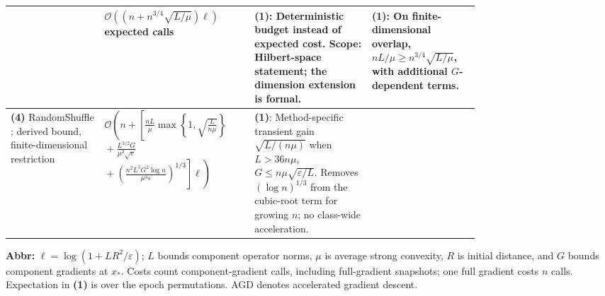 \begin{table}[tp]
\begin{threeparttable}
\begin{tabularx}{\linewidth}{@{}>{\raggedright\arraybackslash}p{0.20\linewidth}>{\raggedright\arraybackslash}p{0.32\linewidth}>{\raggedright\arraybackslash}p{0.25\linewidth}>{\raggedright\arraybackslash}X@{}}
& $\mathcal{O}((n+n^{3/4}\sqrt{L/\mu})\ell)$ expected calls
& \textbf{(1)}: Deterministic budget instead of expected cost. Scope: Hilbert-space statement; the dimension extension is formal.
& \textbf{(1)}: On finite-dimensional overlap, $nL/\mu\ge n^{3/4}\sqrt{L/\mu}$, with additional $G$-dependent terms. \\
\midrule
\textbf{(4)} RandomShuffle \citep[App.~B, Lemmas~6--8, v2]{qfsAhnYunSra2020v2}; derived bound, finite-dimensional restriction
& $\displaystyle\mathcal{O}\!\left(n+\left[\frac{nL}{\mu}\max\!\left\{1,\sqrt{\frac{L}{n\mu}}\right\}\right.\right.$\newline
$\displaystyle{}+\frac{L^{3/2}G}{\mu^2\sqrt\varepsilon}$\newline
$\displaystyle\left.\left.{}+\left(\frac{n^2L^3G^2\log n}{\mu^4\varepsilon}\right)^{1/3}\right]\ell\right)$
& \textbf{(1)}: Method-specific transient gain $\sqrt{L/(n\mu)}$ when $L>36n\mu$, $G\le n\mu\sqrt{\varepsilon/L}$. Removes $(\log n)^{1/3}$ from the cubic-root term for growing $n$; no class-wide acceleration.
& \\
\bottomrule
\end{tabularx}
\begin{tablenotes}[flushleft]\footnotesize
\item[] \textbf{Abbr:} $\ell=\log(1+LR^2/\varepsilon)$; $L$ bounds component operator norms, $\mu$ is average strong convexity, $R$ is initial distance, and $G$ bounds component gradients at $x_*$. Costs count component-gradient calls, including full-gradient snapshots; one full gradient costs $n$ calls. Expectation in \textbf{(1)} is over the epoch permutations. AGD denotes accelerated gradient descent.
\end{tablenotes}
\end{threeparttable}
\end{table}
\clearpage
